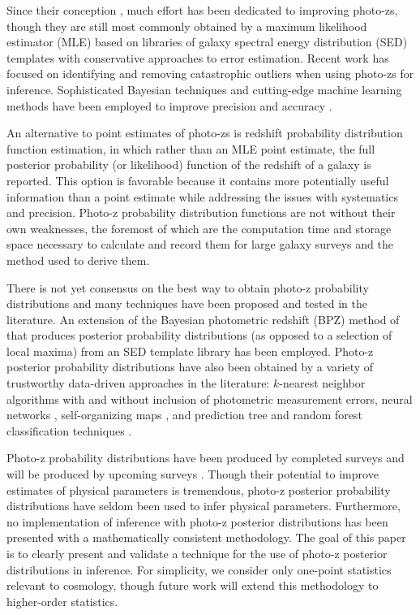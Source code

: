 \documentclass[preprint]{aastex}
\begin{document}
Since their conception \citep{Baum1962}, much effort has been dedicated to 
improving photo-zs, though they are still most commonly obtained by a maximum 
likelihood estimator (MLE) based on libraries of galaxy spectral energy 
distribution (SED) templates with conservative approaches to error estimation.  
Recent work has focused on identifying and removing catastrophic outliers when 
using photo-zs for inference.  \citep{Gorecki2014}  Sophisticated Bayesian 
techniques and cutting-edge machine learning methods have been employed to 
improve precision \citep{Carliles2010} and accuracy \citep{Sadeh2015}. 

An alternative to point estimates of photo-zs is redshift probability 
distribution function estimation, in which rather than an MLE point estimate, 
the full posterior probability (or likelihood) function of the redshift of a 
galaxy is reported.  \citep{Budavari2009}  This option is favorable because it 
contains more potentially useful information than a point estimate while 
addressing the issues with systematics and precision.  Photo-z probability 
distribution functions are not without their own weaknesses, the foremost of 
which are the computation time and storage space necessary to calculate and 
record them for large galaxy surveys  \citep{CarrascoKind2014} and the method 
used to derive them.

There is not yet consensus on the best way to obtain photo-z probability 
distributions and many techniques have been proposed and tested in the 
literature.  An extension of the Bayesian photometric redshift (BPZ) method of 
\citet{Benitez2000} that produces posterior probability distributions (as 
opposed to a selection of local maxima) from an SED template library has been 
employed.  \citep{Hildebrandt2012, Kelly2014, Lopez-Sanjuan2015}  Photo-z 
posterior probability distributions have also been obtained by a variety of 
trustworthy data-driven approaches in the literature: $k$-nearest neighbor 
algorithms with \citep{Ball2008} and without \citep{Sheldon2012} inclusion of 
photometric measurement errors, neural networks \citep{Bonnett2015a}, 
self-organizing maps \citep{CarrascoKind2014a}, and prediction tree and random 
forest classification techniques \citep{Carliles2010, CarrascoKind2013}.  

Photo-z probability distributions have been produced by completed surveys 
\citep{Hildebrandt2012, Sheldon2012} and will be produced by upcoming surveys 
\citep{LSSTScienceCollaboration2009, CarrascoKind2014a}.  Though their 
potential to improve estimates of physical parameters is tremendous, photo-z 
posterior probability distributions have seldom been used to infer physical 
parameters.  Furthermore, no implementation of inference with photo-z posterior 
distributions has been presented with a mathematically consistent methodology.  
The goal of this paper is to clearly present and validate a technique for the 
use of photo-z posterior distributions in inference.  For simplicity, we 
consider only one-point statistics relevant to cosmology, though future work 
will extend this methodology to higher-order statistics.
\end{document}
